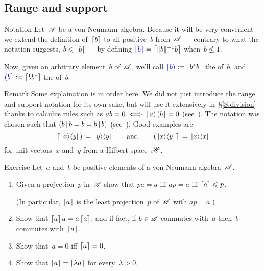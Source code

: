 \documentclass[a]{subfiles}
\begin{document}
\subsection{Range and support}
\begin{parsec}%
\begin{point}[ceill]{Notation}%
Let~$\mathscr{A}$ be a von Neumann algebra.
Because it will be very convenient
we extend the definition of~$\left\lceil b\right\rceil$
to all positive~$b$ from~$\mathscr{A}$
---
contrary to what the notation suggests,
$b\leqslant \left\lceil b\right\rceil$
---
by 
defining $\Define{\ceil{b}}=\ceil{\|b\|^{-1} b}$
when~$b\nleq 1$.

Now, given an arbitrary element~$b$ of~$\mathscr{A}$,
we'll call $\Define{\ceill{b}}:=\ceil{b^*b}$
the  of~$b$,
and~$\Define{\ceilr{b}}:=\ceil{bb^*}$ the  of~$b$.
\end{point}
\begin{point}{Remark}%
Some explaination is in order here.
We did not just introduce
the range
and support notation for its own sake,
but will use it extensively in~\S\ref{S:division}
thanks to calculus rules
such as $ab=0\iff \left\lceil a\right)\left(b\right\rceil=0$
(see~).
The notation was chosen such 
that $\left(b\right\rceil b=b= b\left\lceil b\right)$
(see~).
Good examples are 
\begin{equation*}
	\left\lceil\,\left|x\right>\!\left<y\right|\,\right)
\,= \,\left|y\right>\!\left<y\right|
\qquad\text{and}\qquad
\left(\,\left|x\right>\!\left<y\right|\,\right\rceil
\,=\, \left|x\right>\!\left<x\right|
\end{equation*}
for unit vectors~$x$ and~$y$ from a Hilbert space~$\mathscr{H}$.
\end{point}
\begin{point}{Exercise}%
Let~$a$ and~$b$ be positive elements of a von Neumann algebra~$\mathscr{A}$.
\begin{enumerate}
\item
Given a projection~$p$ in~$\mathscr{A}$
show that $pa=a$ iff $ap=a$ iff $\left\lceil a\right\rceil\leqslant p$.

(In particular, $\left\lceil a\right\rceil$ is the least projection~$p$ of~$\mathscr{A}$
with $a p=a$.)

\item
Show that $\left\lceil a\right\rceil a=a\left\lceil a\right\rceil$,
and if fact, if $b\in\mathscr{A}$ commutes with~$a$
then~$b$ commutes with~$\left\lceil a\right\rceil$.

\item
Show that~$a=0$ iff $\left\lceil a\right\rceil=0$.

\item
Show that $\left\lceil a\right\rceil=\left\lceil\lambda a\right\rceil$
for every~$\lambda>0$.


\end{enumerate}
\end{point}
\end{parsec}
\end{document}
